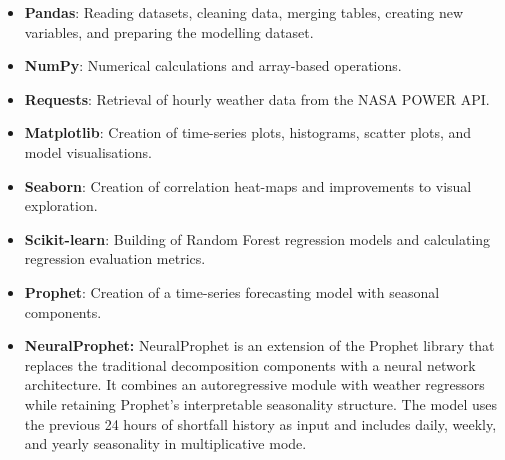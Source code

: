 \documentclass[conference]{IEEEtran}
\begin{document}
\begin{itemize}
    \item \textbf{Pandas}: Reading datasets, cleaning data, merging tables, creating new variables, and preparing the modelling dataset.
    \item \textbf{NumPy}: Numerical calculations and array-based operations.
    \item \textbf{Requests}: Retrieval of hourly weather data from the NASA POWER API.
    \item \textbf{Matplotlib}: Creation of time-series plots, histograms, scatter plots, and model visualisations.
    \item \textbf{Seaborn}: Creation of correlation heat-maps and improvements to visual exploration.
    \item \textbf{Scikit-learn}: Building of Random Forest regression models and calculating regression evaluation metrics.
    \item \textbf{Prophet}: Creation of a time-series forecasting model with seasonal components.
    \item \textbf{NeuralProphet:} NeuralProphet is an extension of the Prophet library that replaces the traditional decomposition components with a neural network architecture. It combines an autoregressive module with weather regressors while retaining Prophet's interpretable seasonality structure. The model uses the previous 24 hours of shortfall history as input and includes daily, weekly, and yearly seasonality in multiplicative mode.
\end{itemize}
\end{document}
